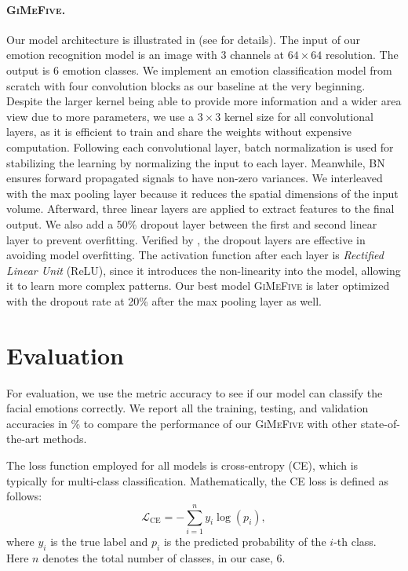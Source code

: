 \paragraph{\textsc{GiMeFive}.}
Our model architecture is illustrated in  (see  for details). 
The input of our emotion recognition model is an image with 3 channels at $64 \times 64 $ resolution. 
The output is 6 emotion classes. %
We implement an emotion classification model from scratch with four convolution blocks as our baseline at the very beginning. 
Despite the larger kernel being able to provide more information and a wider area view due to more parameters, 
we use a $3 \times 3$ kernel size for all convolutional layers, 
as it is efficient to train and share the weights without expensive computation. 
Following each convolutional layer, 
batch normalization is used for stabilizing the learning by normalizing the input to each layer. 
Meanwhile, 
BN ensures forward propagated signals to have non-zero variances. 
We interleaved with the max pooling layer because it reduces the spatial dimensions of the input volume. 
Afterward, three linear layers are applied to extract features to the final output. 
We also add a 50\% dropout layer between the first and second linear layer to prevent overfitting. 
Verified by \citet{BarsoumZCZ16}, 
the dropout layers are effective in avoiding model overfitting. 
The activation function after each layer is \textit{Rectified Linear Unit} (ReLU), 
since it introduces the non-linearity into the model, 
allowing it to learn more complex patterns. 
Our best model \textsc{GiMeFive} is later optimized with the dropout rate at 20\% after the max pooling layer as well.

\section{Evaluation}
\label{sec:evaluation}

For evaluation, we use the metric accuracy to see if our model can classify the facial emotions correctly. 
We report all the training, testing, and validation accuracies in 
\% to compare the performance of our \textsc{GiMeFive} with other state-of-the-art methods. 

The loss function employed for all models is cross-entropy (CE), 
which is typically for multi-class classification. 
Mathematically, the CE loss is defined as follows: 
\begin{equation}
  \mathcal{L}_{\text{CE}} = -\sum_{i=1}^{n} y_i \log(p_i),
\end{equation}
where $y_i$ is the true label and $p_i$ is the predicted probability of the $i$-th class. 
Here $n$ denotes the total number of classes, in our case, 6.

